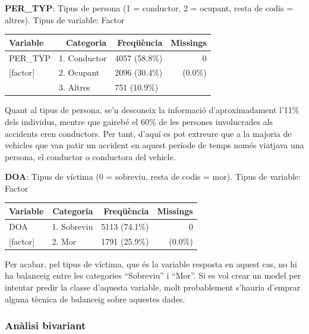 \documentclass[12pt,longbibliography]{article}
\theoremstyle{definition}
\theoremstyle{remark}
\begin{document}
\textbf{PER\_TYP}: Tipus de persona (1 = conductor, 2 = ocupant, resta de codis = altres). Tipus de variable: Factor


\begin{table}[H]
\centering
\begin{tabular}{llll}
\hline
Variable & \multicolumn{1}{r}{Categoria} & \multicolumn{1}{r}{Freqüència} & \multicolumn{1}{r}{Missings} \\ \hline
PER\_TYP    & 1. Conductor  & 4057 (58.8\%) & \multicolumn{1}{r}{0} \\
{[}factor{]}      & 2. Ocupant  & 2096 (30.4\%) & \multicolumn{1}{r}{(0.0\%)} \\
                     & 3. Altres   & 751 (10.9\%) & \multicolumn{1}{r}{}          \\\hline
\end{tabular}
\end{table}

Quant al tipus de persona, se'n desconeix la informació d'aproximadament l'11\% dels individus, mentre que gairebé el 60\% de les persones involucrades als accidents eren conductors. Per tant, d'aquí es pot extreure que a la majoria de vehicles que van patir un accident en aquest període de temps només viatjava una persona, el conductor o conductora del vehicle.


\textbf{DOA}: Tipus de víctima (0 = sobreviu, resta de codis = mor). Tipus de variable: Factor


\begin{table}[H]
\centering
\begin{tabular}{llll}
\hline
Variable & \multicolumn{1}{r}{Categoria} & \multicolumn{1}{r}{Freqüència} & \multicolumn{1}{r}{Missings} \\ \hline
DOA    & 1. Sobreviu  & 5113 (74.1\%) & \multicolumn{1}{r}{0} \\
{[}factor{]} & 2. Mor   & 1791 (25.9\%) & \multicolumn{1}{r}{(0.0\%)}          \\\hline
\end{tabular}
\end{table}

Per acabar, pel tipus de víctima, que és la variable resposta en aquest cas, no hi ha balanceig entre les categories ``Sobreviu'' i ``Mor''. Si es vol crear un model per intentar predir la classe d'aquesta variable, molt probablement s'hauria d'emprar alguna tècnica de balanceig sobre aquestes dades.

\subsubsection{Anàlisi bivariant}
\end{document}
